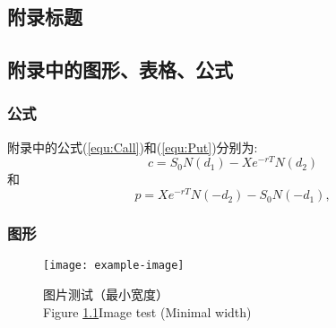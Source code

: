 \begin{appendix}
	\renewcommand{\chaptername}{附录 \Alph{chapter}}
	\renewcommand{\thesection}{\Alph{chapter}.\arabic{section}}
	\renewcommand{\thesubsection}{\Alph{chapter}.\arabic{section}.\arabic{subsection}}
	\renewcommand{\thesubsubsection}{\arabic{subsubsection}.}
	\renewcommand{\thetable}{\Alph{chapter}-\arabic{table}}
	\renewcommand{\theequation}{\Alph{chapter}-\arabic{equation}}
	\renewcommand{\thefigure}{\Alph{chapter}-\arabic{figure}}

\setcounter{subsection}{0}



\chapter{附录标题}
\section{附录中的图形、表格、公式}

\subsection{公式}
附录中的公式(\ref{equ:Call})和(\ref{equ:Put})分别为:
\begin{equation}\label{equ:Call}
c=S_0N(d_1)-X e^{-r T}N(d_2)
\end{equation}
和
\begin{equation}\label{equ:Put}
p=X e^{-r T}N(-d_2)-S_0N(-d_1),
\end{equation}

\subsection{图形}
\begin{figure}[htbp!]
	\centering
	\texttt{[image: example-image]}
	\caption{图片测试（最小宽度）\\Figure \ref{fig-a1}\quad  Image test (Minimal width)\label{fig-a1}}
\end{figure}


\end{appendix}
